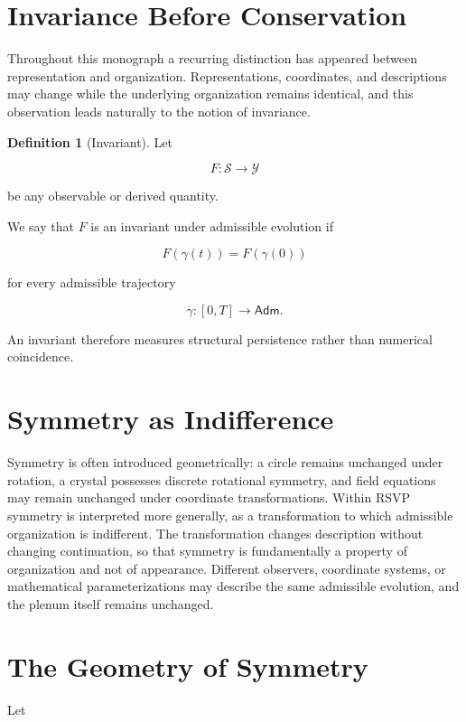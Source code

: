 \documentclass[11pt,oneside]{book}
\numberwithin{equation}{chapter}
\theoremstyle{definition}
\newtheorem{definition}{Definition}[chapter]
\theoremstyle{plain}
\newcommand{\State}{\mathcal{S}}
\newcommand{\Adm}{\mathsf{Adm}}
\begin{document}
\section{Invariance Before Conservation}

Throughout this monograph a recurring distinction has appeared between representation and organization. Representations, coordinates, and descriptions may change while the underlying organization remains identical, and this observation leads naturally to the notion of invariance.

\begin{definition}[Invariant]

Let

\[
F:\State\rightarrow\mathcal{Y}
\]

be any observable or derived quantity.

We say that \(F\) is an invariant under admissible evolution if

\[
F(\gamma(t))
=
F(\gamma(0))
\]

for every admissible trajectory

\[
\gamma:[0,T]\rightarrow\Adm.
\]

\end{definition}

An invariant therefore measures structural persistence rather than numerical
coincidence.

\section{Symmetry as Indifference}

Symmetry is often introduced geometrically: a circle remains unchanged under rotation, a crystal possesses discrete rotational symmetry, and field equations may remain unchanged under coordinate transformations. Within RSVP symmetry is interpreted more generally, as a transformation to which admissible organization is indifferent. The transformation changes description without changing continuation, so that symmetry is fundamentally a property of organization and not of appearance. Different observers, coordinate systems, or mathematical parameterizations may describe the same admissible evolution, and the plenum itself remains unchanged.

\section{The Geometry of Symmetry}

Let
\end{document}
